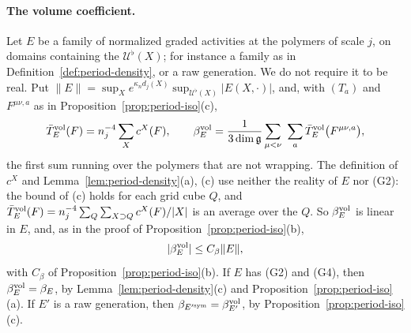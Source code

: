 \paragraph{The volume coefficient.} Let $E$ be a family of normalized graded activities at the polymers of scale $j$, on domains containing the $\mathcal U^\flat(X)$; for instance a family as in Definition~\ref{def:period-density}, or a raw generation. We do not require it to be real. Put $\|E\|=\sup_Xe^{\kappa_nd_j(X)}\sup_{\mathcal U^\flat(X)}|E(X,\cdot)|$, and, with $(T_a)$ and $F^{\mu\nu,a}$ as in Proposition~\ref{prop:period-iso}(c),
\begin{equation}\label{eq:beta-vol}
\bar T^{\rm vol}_E(F)=n_j^{-4}\sum_Xc^X(F),\qquad\beta^{\rm vol}_E=\frac1{3\dim\mathfrak g}\sum_{\mu<\nu}\ \sum_a\bar T^{\rm vol}_E\big(F^{\mu\nu,a}\big),
\end{equation}
the first sum running over the polymers that are not wrapping. The definition of $c^X$ and Lemma~\ref{lem:period-density}(a), (c) use neither the reality of $E$ nor (G2): the bound of (c) holds for each grid cube $Q$, and $\bar T^{\rm vol}_E(F)=n_j^{-4}\sum_Q\sum_{X\supset Q}c^X(F)/|X|$ is an average over the $Q$. So $\beta^{\rm vol}_E$ is linear in $E$, and, as in the proof of Proposition~\ref{prop:period-iso}(b),
\begin{equation}\label{eq:beta-vol-bound}
|\beta^{\rm vol}_E|\le C_\beta\|E\|,
\end{equation}
with $C_\beta$ of Proposition~\ref{prop:period-iso}(b). If $E$ has (G2) and (G4), then $\beta^{\rm vol}_E=\beta_E$, by Lemma~\ref{lem:period-density}(c) and Proposition~\ref{prop:period-iso}(a). If $E'$ is a raw generation, then $\beta_{E'^{\rm sym}}=\beta^{\rm vol}_{E'}$, by Proposition~\ref{prop:period-iso}(c).

